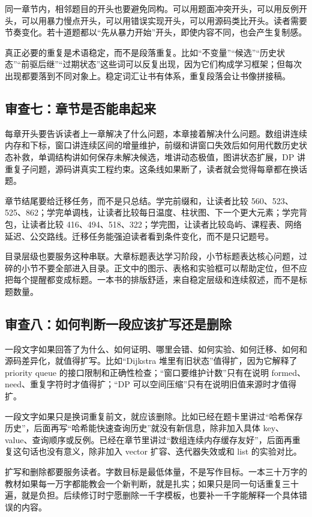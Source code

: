 同一章节内，相邻题目的开头也要避免同构。可以用题面冲突开头，可以用反例开头，可以用暴力慢点开头，可以用错误实现开头，可以用源码类比开头。读者需要节奏变化。若十道题都以“先从暴力开始”开头，即使内容不同，也会产生复制感。

真正必要的重复是术语稳定，而不是段落重复。比如“不变量”“候选”“历史状态”“前驱后继”“过期状态”这些词可以反复出现，因为它们构成学习框架；但每次出现都要落到不同对象上。稳定词汇让书有体系，重复段落会让书像拼接稿。

\subsection{审查七：章节是否能串起来}

每章开头要告诉读者上一章解决了什么问题，本章接着解决什么问题。数组讲连续内存和下标，窗口讲连续区间的增量维护，前缀和讲窗口失效后如何用代数历史状态补救，单调结构讲如何保存未解决候选，堆讲动态极值，图讲状态扩展，DP 讲重复子问题，源码讲真实工程约束。这条线如果断了，读者就会觉得每章都在换话题。

章节结尾要给迁移任务，而不是只总结。学完前缀和，让读者比较 560、523、525、862；学完单调栈，让读者比较每日温度、柱状图、下一个更大元素；学完背包，让读者比较 416、494、518、322；学完图，让读者比较岛屿、课程表、网络延迟、公交路线。迁移任务能强迫读者看到条件变化，而不是只记题号。

目录层级也要服务这种串联。大章标题表达学习阶段，小节标题表达核心问题，过碎的小节不要全部进入目录。正文中的图示、表格和实验框可以帮助定位，但不应把每个提醒都变成标题。一本书的排版舒适，来自稳定层级和连续叙述，而不是标题数量。

\subsection{审查八：如何判断一段应该扩写还是删除}

一段文字如果回答了为什么、如何证明、哪里会错、如何实验、如何迁移、如何和源码差异化，就值得扩写。比如“Dijkstra 堆里有旧状态”值得扩，因为它解释了 priority queue 的接口限制和正确性检查；“窗口要维护计数”只有在说明 formed、need、重复字符时才值得扩；“DP 可以空间压缩”只有在说明旧值来源时才值得扩。

一段文字如果只是换词重复前文，就应该删除。比如已经在题卡里讲过“哈希保存历史”，后面再写“哈希能快速查询历史”就没有新信息，除非加入具体 key、value、查询顺序或反例。已经在章节里讲过“数组连续内存缓存友好”，后面再重复这句话也没有意义，除非加入 vector 扩容、迭代器失效或和 list 的实验对比。

扩写和删除都要服务读者。字数目标是最低体量，不是写作目标。一本三十万字的教材如果每一万字都能教会一个新判断，就是扎实；如果只是同一句话重复三十遍，就是负担。后续修订时宁愿删除一千字模板，也要补一千字能解释一个具体错误的内容。

